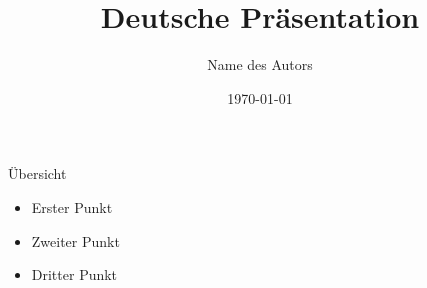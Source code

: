 \documentclass{beamer}
\title{Deutsche Präsentation}
\author{Name des Autors}
\date{\today}
\begin{document}
\begin{frame}
  \titlepage
\end{frame}

\begin{frame}{Übersicht}
  \begin{itemize}
    \item Erster Punkt
    \item Zweiter Punkt
    \item Dritter Punkt
  \end{itemize}
\end{frame}
\end{document}
